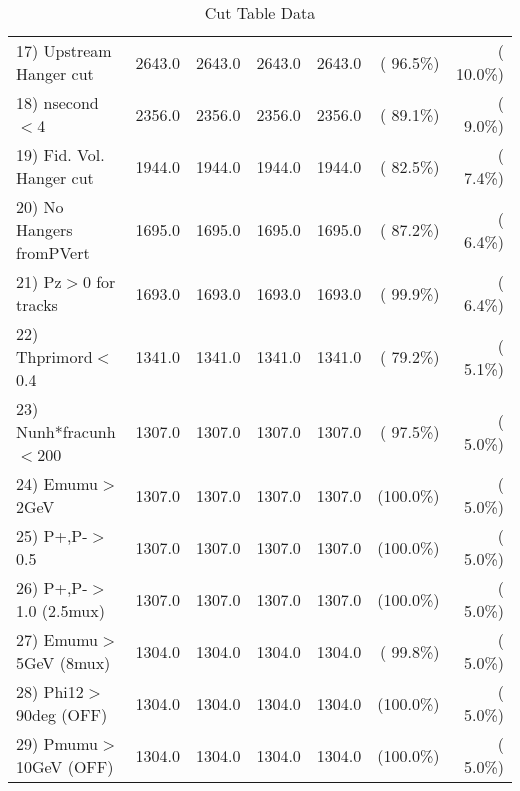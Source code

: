 \begin{table}[h!]
\begin{tabular}{||l||r|r|r|r|r|r||}
 17) Upstream Hanger cut  &       2643.0 &       2643.0 &       2643.0 &       2643.0 & ( 96.5\%) & ( 10.0\%) \\
 18) nsecond$<$4          &       2356.0 &       2356.0 &       2356.0 &       2356.0 & ( 89.1\%) & (  9.0\%) \\
 19) Fid. Vol. Hanger cut &       1944.0 &       1944.0 &       1944.0 &       1944.0 & ( 82.5\%) & (  7.4\%) \\
 20) No Hangers fromPVert &       1695.0 &       1695.0 &       1695.0 &       1695.0 & ( 87.2\%) & (  6.4\%) \\
 21) Pz$>$0 for tracks    &       1693.0 &       1693.0 &       1693.0 &       1693.0 & ( 99.9\%) & (  6.4\%) \\
 22) Thprimord$<$0.4      &       1341.0 &       1341.0 &       1341.0 &       1341.0 & ( 79.2\%) & (  5.1\%) \\
 23) Nunh*fracunh$<$200   &       1307.0 &       1307.0 &       1307.0 &       1307.0 & ( 97.5\%) & (  5.0\%) \\
 24) Emumu$>$2GeV         &       1307.0 &       1307.0 &       1307.0 &       1307.0 & (100.0\%) & (  5.0\%) \\
 25) P+,P-$>$0.5          &       1307.0 &       1307.0 &       1307.0 &       1307.0 & (100.0\%) & (  5.0\%) \\
 26) P+,P-$>$1.0 (2.5mux) &       1307.0 &       1307.0 &       1307.0 &       1307.0 & (100.0\%) & (  5.0\%) \\
 27) Emumu$>$5GeV  (8mux) &       1304.0 &       1304.0 &       1304.0 &       1304.0 & ( 99.8\%) & (  5.0\%) \\
 28) Phi12$>$90deg  (OFF) &       1304.0 &       1304.0 &       1304.0 &       1304.0 & (100.0\%) & (  5.0\%) \\
 29) Pmumu$>$10GeV  (OFF) &       1304.0 &       1304.0 &       1304.0 &       1304.0 & (100.0\%) & (  5.0\%) \\
 \hline
 \hline
 \end{tabular}
 \caption{Cut Table  Data     }
 \label{tab-cutcohjpsi-mumu_data}
 \end{table}
